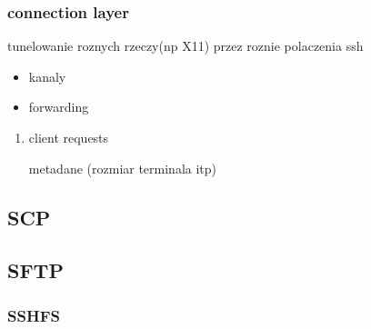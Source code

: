\documentclass[11pt]{article}
\begin{document}
\subsubsection{connection layer}
\label{sec:orgff7fe6f}
tunelowanie roznych rzeczy(np X11) przez roznie polaczenia ssh

\begin{itemize}
\item kanaly
\item forwarding
\end{itemize}
\begin{enumerate}
\item client requests
\label{sec:org5088acf}

metadane (rozmiar terminala itp)
\end{enumerate}
\subsection{SCP}
\label{sec:orga0f988d}
\subsection{SFTP}
\label{sec:orged7aca9}
\subsubsection{SSHFS}
\label{sec:orgec36fa7}
\end{document}
